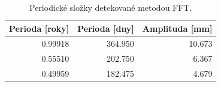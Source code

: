 \begin{table}[H]
\centering
\small
\caption{Periodické složky detekované metodou FFT.}
\label{tab:fft_significant_peaks}
\begin{tabular}{rrr}
\toprule
Perioda [roky] & Perioda [dny] & Amplituda [mm] \\
\midrule
0.99918 & 364.950 & 10.673 \\
0.55510 & 202.750 & 6.367 \\
0.49959 & 182.475 & 4.679 \\
\bottomrule
\end{tabular}
\end{table}
